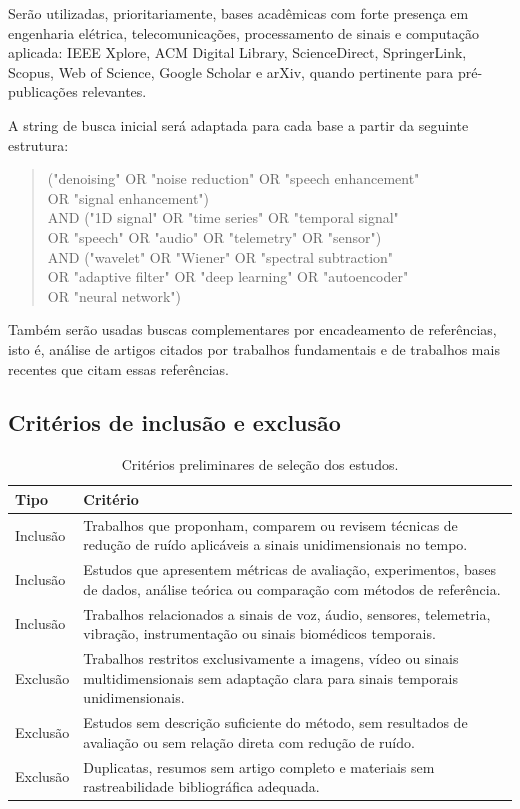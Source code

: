 Serão utilizadas, prioritariamente, bases acadêmicas com forte presença em engenharia elétrica, telecomunicações, processamento de sinais e computação aplicada: IEEE Xplore, ACM Digital Library, ScienceDirect, SpringerLink, Scopus, Web of Science, Google Scholar e arXiv, quando pertinente para pré-publicações relevantes.

\newpage

A string de busca inicial será adaptada para cada base a partir da seguinte estrutura:

\begin{quote}
\small\ttfamily{}
("denoising" OR "noise reduction" OR "speech enhancement"\\
OR "signal enhancement")\\
AND ("1D signal" OR "time series" OR "temporal signal"\\
OR "speech" OR "audio" OR "telemetry" OR "sensor")\\
AND ("wavelet" OR "Wiener" OR "spectral subtraction"\\
OR "adaptive filter" OR "deep learning" OR "autoencoder"\\
OR "neural network")
\end{quote}

Também serão usadas buscas complementares por encadeamento de referências, isto é, análise de artigos citados por trabalhos fundamentais e de trabalhos mais recentes que citam essas referências.

\subsection{Critérios de inclusão e exclusão}

\begin{table}[!htbp]
\centering
\caption{Critérios preliminares de seleção dos estudos.}
\begin{tabularx}{\textwidth}{>{\raggedright\arraybackslash}p{3.6cm}X}
\toprule
\textbf{Tipo} & \textbf{Critério} \\
\midrule
Inclusão & Trabalhos que proponham, comparem ou revisem técnicas de redução de ruído aplicáveis a sinais unidimensionais no tempo. \\
Inclusão & Estudos que apresentem métricas de avaliação, experimentos, bases de dados, análise teórica ou comparação com métodos de referência. \\
Inclusão & Trabalhos relacionados a sinais de voz, áudio, sensores, telemetria, vibração, instrumentação ou sinais biomédicos temporais. \\
Exclusão & Trabalhos restritos exclusivamente a imagens, vídeo ou sinais multidimensionais sem adaptação clara para sinais temporais unidimensionais. \\
Exclusão & Estudos sem descrição suficiente do método, sem resultados de avaliação ou sem relação direta com redução de ruído. \\
Exclusão & Duplicatas, resumos sem artigo completo e materiais sem rastreabilidade bibliográfica adequada. \\
\bottomrule
\end{tabularx}
\end{table}

